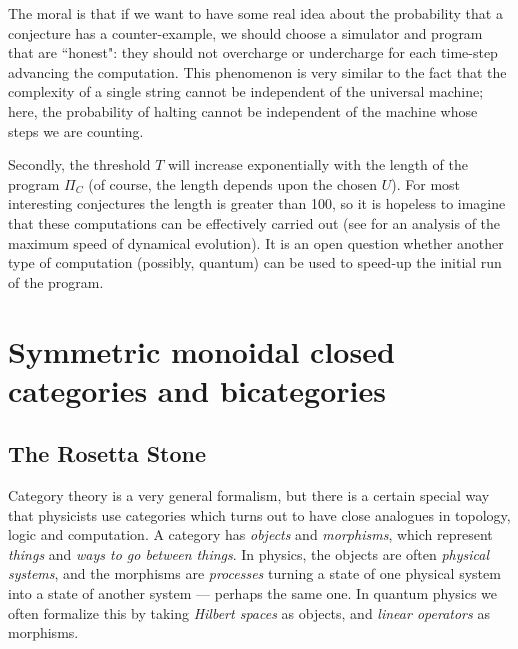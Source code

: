 \documentclass[12pt,twoside,openright]{report}
\begin{document}
The moral is that if we want to have some real idea about the probability that a conjecture has a counter-example, we should choose a simulator and program that are  ``honest":  they should not overcharge or undercharge for each time-step advancing the computation.  This phenomenon is very similar to the fact that the complexity of a single string cannot be independent of the universal machine; here, the probability of halting cannot be independent of the machine whose steps we are counting.

Secondly, the threshold $T$ will increase exponentially with the length of the program $\Pi_{C}$ (of course, the length depends upon the chosen $U$). For most interesting conjectures the length is greater than 100, so  it   is hopeless to imagine that these computations can be effectively carried out (see \cite{ml} for an analysis of the maximum speed of dynamical evolution). It is an open question whether another type of computation (possibly, quantum) can be used to speed-up the initial run of the program.



\setcounter{chapter}{0}
\part{Symmetric monoidal closed categories and bicategories}
\chapter{The Rosetta Stone}

Category theory is a very general formalism, but there is a certain special way that physicists use categories which turns out to have close analogues in topology, logic and computation.  A category has
\emph{objects} and \emph{morphisms}, which represent \emph{things} and
\emph{ways to go between things}.  In physics, the objects are often 
\emph{physical systems}, and the morphisms are \emph{processes} turning a state of one physical system into a state of another system ---
perhaps the same one.  In quantum physics we often formalize this by taking \emph{Hilbert spaces} as objects, and \emph{linear operators}
as morphisms.
\end{document}
